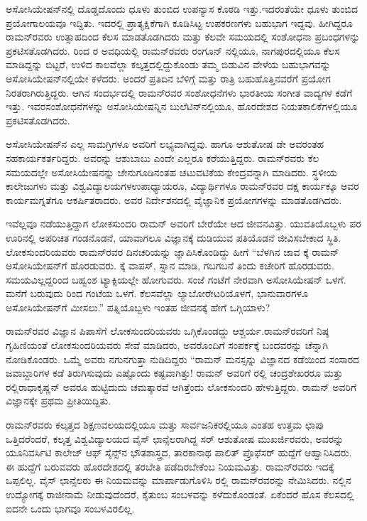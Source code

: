 ಅಸೋಸಿಯೇಷನ್‍ನಲ್ಲಿ ದೊಡ್ಡದೊಂದು ಧೂಳು ತುಂಬಿದ ಉಪನ್ಯಾಸ ಕೊಠಡಿ ಇತ್ತು.\break ಇದರಂತೆಯೇ ಧೂಳು ತುಂಬಿದ ಪ್ರಯೋಗಾಲಯವೂ ಇದ್ದಿತು. ಇದರಲ್ಲಿ ಪ್ರಾತ್ಯಕ್ಷಿಕೆಗಾಗಿ ಕೂಡಿಸಿಟ್ಟ ಉಪಕರಣಗಳು ಬಹುಭಾಗ ಇದ್ದವು. ಹೀಗಿದ್ದರೂ ರಾಮನ್‍ರವರು ಉತ್ಸಾಹದಿಂದ ಕೆಲಸ ಮಾಡತೊಡಗಿದರು ಮತ್ತು ಕೆಲವೇ ಸಮಯದಲ್ಲಿ ಸಂಶೋಧನಾ ಪ್ರಬಂಧಗಳನ್ನು ಪ್ರಕಟಿಸ\break ತೊಡಗಿದರು. ರಿಂದ ರ ಅವಧಿಯಲ್ಲಿ ರಾಮನ್‍ರವರು ರಂಗೂನ್ ನಲ್ಲಿಯೂ, ನಾಗಪುರದಲ್ಲಿಯೂ ಕೆಲಸ ಮಾಡಿದ್ದನ್ನು ಬಿಟ್ಟರೆ, ಉಳಿದ ಕಾಲವೆಲ್ಲಾ ಕಲ್ಕತ್ತದಲ್ಲಿದ್ದುಕೊಂಡು ತಮ್ಮ ಬಿಡುವಿನ ವೇಳೆಯ ಬಹುಭಾಗವನ್ನು ಅಸೋಸಿಯೇಷನ್‍ನಲ್ಲಿಯೇ ಕಳೆದರು. ಅಂದರೆ ಪ್ರತಿದಿನ ಬೆಳಿಗ್ಗೆ ಮತ್ತು ರಾತ್ರಿ ಬಹುಹೊತ್ತಿನವರೆಗೆ ಪ್ರಯೋಗ ನಿರತರಾಗಿರುತ್ತಿದ್ದರು. ಆಗಿನ ಸಂದರ್ಭದಲ್ಲಿ ರಾಮನ್‍ರವರ ಸಂಶೋಧನೆಗಳು ಭಾರತೀಯ ಸಂಗೀತ ವಾದ್ಯಗಳ ಕಡೆಗೆ ಇತ್ತು. ಇವರ\break ಸಂಶೋಧನೆಗಳನ್ನು ಅಸೋಸಿಯೇಷನ್ನಿನ ಬುಲೆಟಿನ್‍ನಲ್ಲಿಯೂ, ಹೊರದೇಶದ ನಿಯತಕಾಲಿಕೆ\break ಗಳಲ್ಲಿಯೂ ಪ್ರಕಟಿಸತೊಡಗಿದರು.

ಅಸೋಸಿಯೇಷನ್‍ನ ಎಲ್ಲ ಸಾಮಗ್ರಿಗಳೂ ಅವರಿಗೆ ಲಭ್ಯವಾಗಿದ್ದವು. ಹಾಗೂ ಆಶುತೋಷ ಡೇ ಅವರಂತಹ ಸಹಕಾರ್ಯಕರ್ತರಿದ್ದರು. ಅವರನ್ನು ಆಶುಬಾಬು ಎಂದೇ ಎಲ್ಲರೂ ಕರೆಯುತ್ತಿದ್ದರು. ರಾಮನ್‍ರವರು ಕೆಲ ಸಮಯದಲ್ಲೇ ಅಸೋಸಿಯೇಷನನ್ನು ಜೇನುಗೂಡಿನಂತಹ ಚಟುವಟಿಕೆಯ ಕೇಂದ್ರವನ್ನಾಗಿ ಮಾಡಿದರು. ಸ್ಥಳೀಯ ಕಾಲೇಜುಗಳು ಮತ್ತು ವಿಶ್ವವಿದ್ಯಾಲಯಗಳ\break ಉಪಾಧ್ಯಾಯರೂ, ವಿದ್ಯಾರ್ಥಿಗಳೂ ರಾಮನ್‍ರವರ ದಕ್ಷ ಕಾರ್ಯಕ್ಕೂ ಅವರ ಕಾರ್ಯಮಗ್ನತೆಗೂ ಆಕರ್ಷಿತರಾದರು. ಅವರ ನಿರ್ದೇಶನದಲ್ಲಿ ವೈಜ್ಞಾನಿಕ ಪ್ರಯೋಗಗಳನ್ನು ಮಾಡತೊಡಗಿದರು.

ಇವೆಲ್ಲವೂ ನಡೆಯುತ್ತಿದ್ದಾಗ ಲೋಕಸುಂದರಿ ರಾಮನ್ ಅವರಿಗೆ ಬೇರೆಯೇ ಆದ ಜೀವನವಿತ್ತು. ಯುವತಿಯೊಬ್ಬಳು ಪರ ಊರಿನಲ್ಲಿ ಅಪರಿಚಿತ ಗಂಡನೊಡನೆ, ಯಾವಾಗಲೂ ವಿಜ್ಞಾನಕ್ಕೆ ದುಡಿಯುವ ಪತಿಯೊಡನೆ ಜೀವಿಸಬೇಕಾದ ಸ್ಥಿತಿ. ಲೋಕಸುಂದರಿಯವರು ರಾಮನ್‍ರವರ ದಿನಚರಿಯನ್ನು ಜ್ಞಾಪಿಸಿಕೊಂಡಿದ್ದು ಹೀಗೆ\enginline{-} “ಬೆಳಗಿನ ಜಾವ  ಕ್ಕೆ ರಾಮನ್ ಅಸೋಸಿಯೇಷನ್‍ಗೆ ಹೊರಡುವರು. ಕ್ಕೆ ವಾಪಸ್, ಸ್ನಾನ ಮಾಡಿ, ಗಬಗಬನೆ ತಿಂದು ಕಚೇರಿಗೆ ಹೊರಡುವರು. ಸಮಯವಿಲ್ಲದ್ದರಿಂದ ಬಹ್ವಂಶ ಟ್ಯಾಕ್ಸಿಯಲ್ಲೇ ಹೋಗುವರು. ಸಂಜೆ  ಗಂಟೆಗೆ ನೇರವಾಗಿ ಅಸೋಸಿಯೇಷನ್ ಒಳಗೆ. ಮನೆಗೆ ಬರುವುದು  ರಿಂದ  ಗಂಟೆಯ ಒಳಗೆ. ಕೆಲಸವೆಲ್ಲಾ ಲ್ಯಾಬೋರೇಟರಿಯೊಳಗೆ, ಭಾನುವಾರಗಳೂ ಅಸೋಸಿಯೇಷನ್‍ಗೆ ಮೀಸಲು.” ಪತ್ನಿಯೊಬ್ಬಳು ಇಂತಹ ಜೀವನಕ್ಕೆ ಹೇಗೆ ಒಗ್ಗಿಯಾಳು?

ರಾಮನ್‍ರವರ ವಿಜ್ಞಾನ ಪಿಪಾಸೆಗೆ ಲೋಕಸುಂದರಿಯವರು ಒಗ್ಗಿಕೊಂಡದ್ದು ಆಶ್ಚರ್ಯ.\break ರಾಮನ್‍ರವರಿಗೆ ನಿಷ್ಠ ಗೃಹಿಣಿಯಂತೆ ಲೋಕಸುಂದರಿಯವರು ಸೇವೆ ಮಾಡಿದರು, ಅವರೊಂದಿಗೆ ಸಂಪರ್ಕಕ್ಕೆ ಬಂದವರನ್ನು ಚೆನ್ನಾಗಿ ನೋಡಿಕೊಂಡರು. ಒಮ್ಮೆ ಅವರು ನಗುನಗುತ್ತಾ ನುಡಿದಿದ್ದರು  “ರಾಮನ್ ಮನಸ್ಸನ್ನು ವಿಜ್ಞಾನದ ಕಡೆಯಿಂದ ಸಂಸಾರದ ಜವಾಬ್ದಾರಿಗಳ ಕಡೆ ತಿರುಗಿಸುವುದು ಎಷ್ಟೊಂದು ಕಷ್ಟವಾಗಿತ್ತು! ರಾಮನ್ ಅವರಿಗೆ ರಲ್ಲಿ ಚಂದ್ರಶೇಖರರೂ ಮತ್ತು ರಲ್ಲಿ\break ರಾಧಾಕೃಷ್ಣನ್ ಅವರೂ ಹುಟ್ಟಿದುದು ಚಮತ್ಕಾರವೆ ಆಗಿತ್ತೆಂದು ಲೋಕಸುಂದರಿ ಹೇಳುತ್ತಿದ್ದರು. ರಾಮನ್ ಅವರಿಗೆ ವಿಜ್ಞಾನಕ್ಕೇ ಪ್ರಥಮ ಪ್ರೀತಿಯಿದ್ದಿತು.



ರಾಮನ್‍ರವರು ಕಲ್ಕತ್ತದ ಶಿಕ್ಷಣವಲಯದಲ್ಲಿಯೂ ಮತ್ತು ಸಾರ್ವಜನಿಕರಲ್ಲಿಯೂ ಎಂತಹ ಉತ್ತಮ ಛಾಪು ಒತ್ತಿದರೆಂದರೆ, ಕಲ್ಕತ್ತ ವಿಶ್ವವಿದ್ಯಾಲಯದ ವೈಸ್ ಛಾನ್ಸೆಲರಾಗಿದ್ದ ಸರ್ ಆಶುತೋಷ ಮುಖರ್ಜಿರವರು, ಅವರನ್ನು ಯೂನಿವರ್ಸಿಟಿ ಕಾಲೇಜ್ ಆಫ್ ಸೈನ್ಸ್‌ನ ಭೌತಶಾಸ್ತ್ರದ, ತಾರಕಾನಾಥ ಪಾಲಿತ್ ಪ್ರೊಫೆಸರ್ ಹುದ್ದೆಗೆ ಆಹ್ವಾನಿಸಿದರು. ಈ ಹುದ್ದೆಗೆ ಬರುವವರು ಹೊರದೇಶದಲ್ಲಿ ತರಬೇತಿ ಪಡೆದಿರಬೇಕೆಂಬ ನಿಯಮವಿತ್ತು. ರಾಮನ್‍ರವರು ಇದಕ್ಕೆ ಒಪ್ಪಲಿಲ್ಲ. ವೈಸ್ ಛಾನ್ಸೆಲರು ಈ ನಿಯಮವನ್ನು ಮಾರ್ಪಾಡುಗೊಳಿಸಿ ರಲ್ಲಿ ರಾಮನ್‍ರವರನ್ನು ನೇಮಿಸಿದರು.  ನಲ್ಲಿನ ಉದ್ಯೋಗಕ್ಕೆ ರಾಜೀನಾಮೆ ನೀಡುವುದೆಂದರೆ, ಕೈತುಂಬ ಸಂಬಳವನ್ನು ಕಳೆದುಕೊಂಡಂತೆ. ಏಕೆಂದರೆ ಹೊಸ ಕೆಲಸದಲ್ಲಿ ಐದನೇ ಒಂದು ಭಾಗವೂ ಸಂಬಳವಿರಲಿಲ್ಲ.

